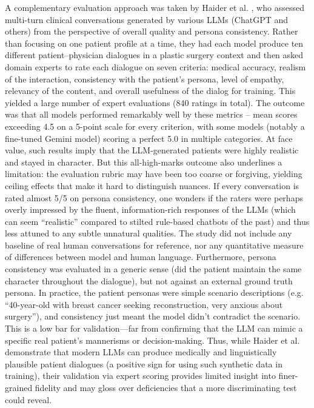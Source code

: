 A complementary evaluation approach was taken by Haider et al. \cite{Haider2025}, who assessed multi-turn clinical conversations generated by various LLMs (ChatGPT and others) from the perspective of overall quality and persona consistency. Rather than focusing on one patient profile at a time, they had each model produce ten different patient–physician dialogues in a plastic surgery context and then asked domain experts to rate each dialogue on seven criteria: medical accuracy, realism of the interaction, consistency with the patient’s persona, level of empathy, relevancy of the content, and overall usefulness of the dialog for training. This yielded a large number of expert evaluations (840 ratings in total). The outcome was that all models performed remarkably well by these metrics – mean scores exceeding 4.5 on a 5-point scale for every criterion, with some models (notably a fine-tuned Gemini model) scoring a perfect 5.0 in multiple categories. At face value, such results imply that the LLM-generated patients were highly realistic and stayed in character. But this all-high-marks outcome also underlines a limitation: the evaluation rubric may have been too coarse or forgiving, yielding ceiling effects that make it hard to distinguish nuances. If every conversation is rated almost 5/5 on persona consistency, one wonders if the raters were perhaps overly impressed by the fluent, information-rich responses of the LLMs (which can seem “realistic” compared to stilted rule-based chatbots of the past) and thus less attuned to any subtle unnatural qualities. The study did not include any baseline of real human conversations for reference, nor any quantitative measure of differences between model and human language. Furthermore, persona consistency was evaluated in a generic sense (did the patient maintain the same character throughout the dialogue), but not against an external ground truth persona. In practice, the patient personas were simple scenario descriptions (e.g. “40-year-old with breast cancer seeking reconstruction, very anxious about surgery”), and consistency just meant the model didn’t contradict the scenario. This is a low bar for validation—far from confirming that the LLM can mimic a specific real patient’s mannerisms or decision-making. Thus, while Haider et al. demonstrate that modern LLMs can produce medically and linguistically plausible patient dialogues (a positive sign for using such synthetic data in training), their validation via expert scoring provides limited insight into finer-grained fidelity and may gloss over deficiencies that a more discriminating test could reveal.

